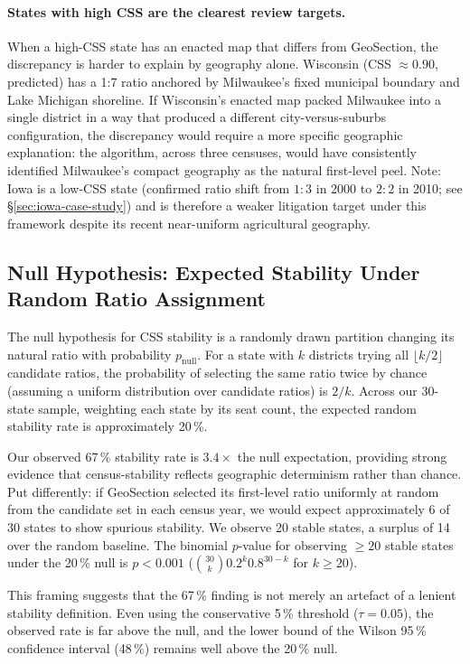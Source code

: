 \paragraph{States with high CSS are the clearest review targets.}
When a high-CSS state has an enacted map that differs from GeoSection,
the discrepancy is harder to explain by geography alone.
Wisconsin (CSS $\approx 0.90$, predicted) has a 1:7 ratio anchored by
Milwaukee's fixed municipal boundary and Lake Michigan shoreline.
If Wisconsin's enacted map packed Milwaukee into a single district in a
way that produced a different city-versus-suburbs configuration, the
discrepancy would require a more specific geographic explanation: the
algorithm, across three censuses, would have consistently identified
Milwaukee's compact geography as the natural first-level peel.
Note: Iowa is a low-CSS state (confirmed ratio shift from $1:3$ in 2000 to
$2:2$ in 2010; see \S\ref{sec:iowa-case-study}) and is therefore a weaker
litigation target under this framework despite its recent near-uniform
agricultural geography.

\subsection{Null Hypothesis: Expected Stability Under Random Ratio Assignment}
\label{sec:null-hypothesis}

The null hypothesis for CSS stability is a randomly drawn partition changing
its natural ratio with probability $p_{\text{null}}$.
For a state with $k$ districts trying all $\lfloor k/2 \rfloor$ candidate
ratios, the probability of selecting the same ratio twice by chance (assuming
a uniform distribution over candidate ratios) is $2/k$.
Across our 30-state sample, weighting each state by its seat count, the
expected random stability rate is approximately 20\,\%.

Our observed 67\,\% stability rate is $3.4\times$ the null expectation,
providing strong evidence that census-stability reflects geographic
determinism rather than chance.
Put differently: if GeoSection selected its first-level ratio uniformly at
random from the candidate set in each census year, we would expect
approximately 6 of 30 states to show spurious stability.
We observe 20 stable states, a surplus of 14 over the random baseline.
The binomial $p$-value for observing $\geq 20$ stable states under the 20\,\%
null is $p < 0.001$ ($\binom{30}{k} 0.2^k 0.8^{30-k}$ for $k \geq 20$).

This framing suggests that the 67\,\% finding is not merely an artefact of a
lenient stability definition.
Even using the conservative 5\,\% threshold ($\tau = 0.05$), the observed
rate is far above the null, and the lower bound of the Wilson 95\,\%
confidence interval (48\,\%) remains well above the 20\,\% null.

